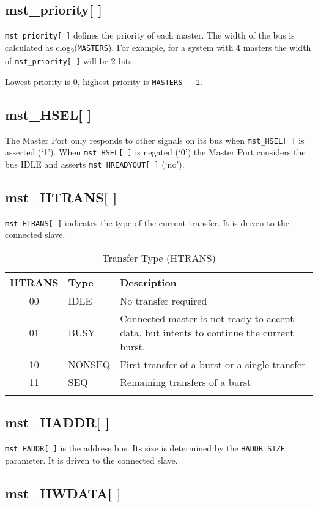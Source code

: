\subsection{mst\_priority[ ]}\label{mst_priority}

\texttt{mst\_priority[\,]} defines the priority of each master. The width of the bus is calculated as clog\textsubscript{2}(\texttt{MASTERS}). For example, for a system with 4 masters the width of \texttt{mst\_priority[\,]} will be 2 bits.

Lowest priority is 0, highest priority is \texttt{MASTERS - 1}.

\subsection{mst\_HSEL[ ]}\label{mst_hsel}

The Master Port only responds to other signals on its bus when \texttt{mst\_HSEL[\,]} is
asserted (`1'). When \texttt{mst\_HSEL[\,]} is negated (`0') the Master Port
considers the bus IDLE and asserts \texttt{mst\_HREADYOUT[\,]} (`no').

\subsection{mst\_HTRANS[ ]}\label{mst_htrans}

\texttt{mst\_HTRANS[ ]} indicates the type of the current transfer. It is driven to
the connected slave.

\begin{longtable}[]{@{}clp{9cm}@{}}
\toprule
HTRANS & Type & Description\tabularnewline
\midrule
\endhead
00 & IDLE & No transfer required\tabularnewline
01 & BUSY & Connected master is not ready to accept data, but intents to
continue the current burst.\tabularnewline
10 & NONSEQ & First transfer of a burst or a single
transfer\tabularnewline
11 & SEQ & Remaining transfers of a burst\tabularnewline
\bottomrule
\caption{Transfer Type (HTRANS)}
\end{longtable}


\subsection{mst\_HADDR[ ]}\label{mst_haddr}

\texttt{mst\_HADDR[\,]} is the address bus. Its size is determined by the \texttt{HADDR\_SIZE}
parameter. It is driven to the connected slave.

\subsection{mst\_HWDATA[ ]}\label{mst_hwdata}

